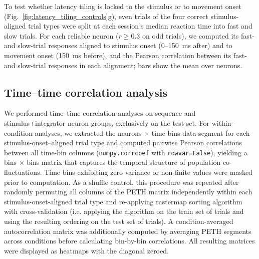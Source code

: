\documentclass[10pt,lineno]{elife}
\begin{document}
To test whether latency tiling is locked to the stimulus or to movement onset (Fig.~\ref{fig:latency_tiling_controls}g), even trials of the four correct stimulus-aligned trial types were split at each session's median reaction time into fast and slow trials. For each reliable neuron ($r\geq0.3$ on odd trials), we computed its fast- and slow-trial responses aligned to stimulus onset (0--150~ms after) and to movement onset (150~ms before), and the Pearson correlation between its fast- and slow-trial responses in each alignment; bars show the mean over neurons.

\iffalse %
\subsection{Time–time correlation analysis}
We performed time–time correlation analyses on sequence and stimulus+integrator neuron groups, exclusively on the test set. For within-condition analyses, we extracted the neurons $\times$ time-bins data segment for each stimulus-onset–aligned trial type and computed pairwise Pearson correlations between all time-bin columns (\texttt{numpy.corrcoef} with \texttt{rowvar=False}), yielding a bins $\times$ bins matrix that captures the temporal structure of population co-fluctuations. Time bins exhibiting zero variance or non-finite values were masked prior to computation. As a shuffle control, this procedure was repeated after randomly permuting all columns of the PETH matrix independently within each stimulus-onset-aligned trial type and re-applying rastermap sorting algorithm with cross-validation (i.e. applying the algorithm on the train set of trials and using the resulting ordering on the test set of trials). A condition-averaged autocorrelation matrix was additionally computed by averaging PETH segments across conditions before calculating bin-by-bin correlations. All resulting matrices were displayed as heatmaps with the diagonal zeroed.
\end{document}
